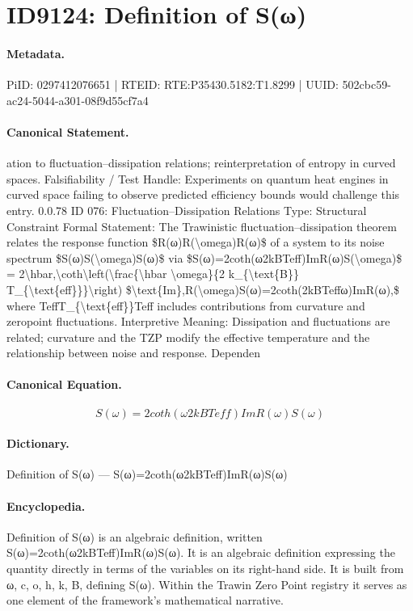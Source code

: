 \section*{ID9124: Definition of S(ω)}
\paragraph{Metadata.}
PiID: 0297412076651 | RTEID: RTE:P35430.5182:T1.8299 | UUID: 502cbc59-ac24-5044-a301-08f9d55cf7a4

\paragraph{Canonical Statement.}
ation to fluctuation–dissipation relations; reinterpretation of entropy in curved spaces. Falsifiability / Test Handle: Experiments on quantum heat engines in curved space failing to observe predicted efficiency bounds would challenge this entry. 0.0.78 ID 076: Fluctuation–Dissipation Relations Type: Structural Constraint Formal Statement: The Trawinistic fluctuation–dissipation theorem relates the response function \$R(ω)R(\textbackslash{}omega)R(ω)\$ of a system to its noise spectrum \$S(ω)S(\textbackslash{}omega)S(ω)\$ via \$S(ω)=2coth(ω2kBTeff)ImR(ω)S(\textbackslash{}omega)\$ = 2\textbackslash{}hbar,\textbackslash{}coth\textbackslash{}left(\textbackslash{}frac\{\textbackslash{}hbar \textbackslash{}omega\}\{2 k\_\{\textbackslash{}text\{B\}\} T\_\{\textbackslash{}text\{eff\}\}\}\textbackslash{}right) \$\textbackslash{}text\{Im\},R(\textbackslash{}omega)S(ω)=2coth(2kBTeffω)ImR(ω),\$ where TeffT\_\{\textbackslash{}text\{eff\}\}Teff includes contributions from curvature and zeropoint fluctuations. Interpretive Meaning: Dissipation and fluctuations are related; curvature and the TZP modify the effective temperature and the relationship between noise and response. Dependen

\paragraph{Canonical Equation.}
\[
S(ω)=2coth(ω2kBTeff)ImR(ω)S(\omega)
\]

\paragraph{Dictionary.}
Definition of S(ω) — S(ω)=2coth(ω2kBTeff)ImR(ω)S(ω)

\paragraph{Encyclopedia.}
Definition of S(ω) is an algebraic definition, written S(ω)=2coth(ω2kBTeff)ImR(ω)S(ω). It is an algebraic definition expressing the quantity directly in terms of the variables on its right-hand side. It is built from ω, c, o, h, k, B, defining S(ω). Within the Trawin Zero Point registry it serves as one element of the framework's mathematical narrative.
